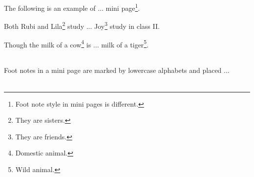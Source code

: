 \documentclass[]{article}
\begin{document}
	\Large
The following is an example of ... mini page\footnote{Foot note style in mini pages is different.}.\\[5mm]
%
	\begin{minipage}[t]{0.45\linewidth} %
		Both Rubi and Lila\footnote{They are sisters.} study ... Joy\footnote{They are friends.} study in class II. 
	\end{minipage}\hfill
%
	\begin{minipage}[t]{0.45\linewidth}
	Though the milk of a cow\footnote{Domestic animal.} is ... milk of a tiger\footnote{Wild animal.}.
	\end{minipage}\\[10mm]
%
	Foot notes in a mini page are marked by lowercase alphabets and placed ...\\\\
	
	
	
\end{document}
